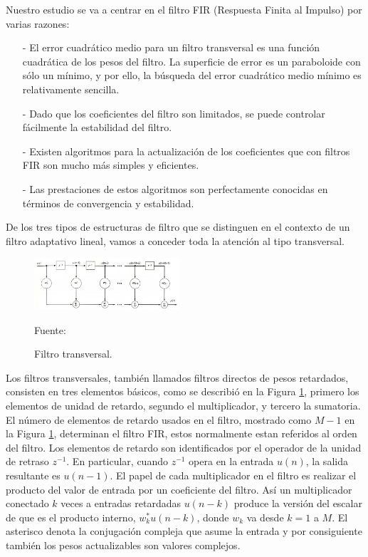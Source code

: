 \begin{enumerate}
\begin{enumerate}
Nuestro estudio se va a centrar en el filtro FIR (Respuesta Finita al Impulso) por varias razones:
\begin{enumerate}
\item[-]El error cuadrático medio para un filtro transversal es una función cuadrática de los pesos del filtro. La superficie de error es un paraboloide con sólo un mínimo, y por ello, la búsqueda del error cuadrático medio mínimo es relativamente sencilla.
\item[-]Dado que los coeficientes del filtro son limitados, se puede controlar fácilmente la estabilidad del filtro.
\item[-]Existen algoritmos para la actualización de los coeficientes que con filtros FIR son mucho más simples y eficientes.
\item[-]Las prestaciones de estos algoritmos son perfectamente conocidas en términos de convergencia y estabilidad.
\end{enumerate}
De los tres tipos de estructuras de filtro que se distinguen en el contexto de un filtro adaptativo lineal, vamos a conceder toda la atención al tipo transversal.
\begin{figure}[ht]
\begin{center}
\includegraphics[width=0.48\textwidth]{Imagenes/Cap2/image016}
\end{center}
\begin{center}
\vskip -0.5cm
\caption{\small{Filtro transversal.}}
\label{fig:figura2.16}
{\small{Fuente: \cite{walter}}}
\end{center}
\end{figure}
\vskip -0.5cm
\newpage
Los filtros transversales, también llamados filtros directos de pesos retardados, consisten en tres elementos básicos, como se describió en la Figura \ref{fig:figura2.16}, primero los elementos de unidad de retardo, segundo el multiplicador, y tercero la sumatoria. El número de elementos de retardo usados en el filtro, mostrado como $M-1$ en la Figura \ref{fig:figura2.16}, determinan el filtro FIR, estos normalmente estan referidos al orden del filtro. Los elementos de retardo son identificados por el operador de la unidad de retraso $z^{-1}$. 
\vskip 0.5cm
En particular, cuando $z^{-1}$ opera en la entrada $u(n)$, la salida resultante es $u(n-1)$. El papel de cada multiplicador en el filtro es realizar el producto del valor de entrada por un coeficiente del filtro. Así un multiplicador conectado $k$ veces a entradas retardadas $u(n-k)$ produce la versión del escalar de que es el producto interno, $w^{*}_{k}u(n-k)$, donde $w_{k}$ va desde $k=1$ a $M$. El asterisco denota la conjugación compleja que asume la entrada y por consiguiente también los pesos actualizables son valores complejos. 

\end{enumerate}
\end{enumerate}
